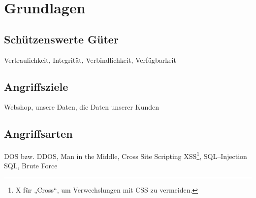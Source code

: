 \section{Grundlagen}
\label{sec:grundlagen}

\subsection{Schützenswerte Güter}

Vertraulichkeit, Integrität, Verbindlichkeit, Verfügbarkeit

\subsection{Angriffsziele}

Webshop, unsere Daten, die Daten unserer Kunden

\subsection{Angriffsarten}

\ac{DOS} bzw. \ac{DDOS}, Man in the Middle, Cross Site Scripting \acs{XSS}\footnote{X für „Cross“, um Verwechslungen mit \ac{CSS} zu vermeiden.}, SQL--Injection \ac{SQL}, Brute Force